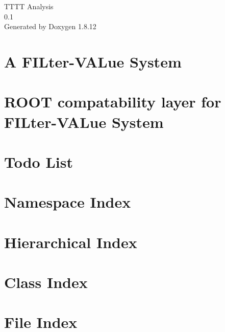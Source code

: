 \documentclass[twoside]{book}
\newcommand{\+}{\discretionary{\mbox{\scriptsize$\hookleftarrow$}}{}{}}
\newcommand{\clearemptydoublepage}{%
  \newpage{\pagestyle{empty}\cleardoublepage}%
}
\begin{document}
\hypersetup{pageanchor=false,
             bookmarksnumbered=true,
             pdfencoding=unicode
            }
\begin{titlepage}
\vspace*{7cm}
\begin{center}%
{\Large T\+T\+TT Analysis \\[1ex]\large 0.\+1 }\\
\vspace*{1cm}
{\large Generated by Doxygen 1.8.12}\\
\end{center}
\end{titlepage}
\clearemptydoublepage
{}
\tableofcontents
\clearemptydoublepage
{}
\hypersetup{pageanchor=true}

\chapter{A F\+I\+Lter-\/\+V\+A\+Lue System}
\label{md__home_caleb_Sources_TTTT_filval_README}
\hypertarget{md__home_caleb_Sources_TTTT_filval_README}{}

\chapter{R\+O\+OT compatability layer for F\+I\+Lter-\/\+V\+A\+Lue System}
\label{md__home_caleb_Sources_TTTT_filval_root_README}
\hypertarget{md__home_caleb_Sources_TTTT_filval_root_README}{}

\chapter{Todo List}
\label{todo}
\hypertarget{todo}{}

\chapter{Namespace Index}

\chapter{Hierarchical Index}

\chapter{Class Index}

\chapter{File Index}

\end{document}

